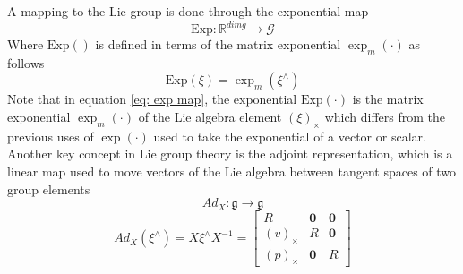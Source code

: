 A mapping to the Lie group is done through the exponential map \cite{Contact-Aided_Invarant_EKF}
\begin{equation}
    \text{Exp} : \mathbb{R}^{dim g} \rightarrow \mathcal{G}
    \label{eq: exp map}
\end{equation}
Where $\text{Exp}()$ is defined in terms of the matrix exponential $ \exp_m{(\cdot)}$ as follows
\begin{equation}
    \text{Exp}(\xi) = \exp_m{(\xi^{\wedge})}
    \label{eq: matrix exp def}
\end{equation}
Note that in equation \eqref{eq: exp map}, the exponential $\text{Exp}{(\cdot)}$ is the matrix exponential $\exp_m{(\cdot)}$ of the Lie algebra element $(\xi)_{\times}$ which differs from the previous uses of $\exp{(\cdot)}$ used to take the exponential of a vector or scalar. Another key concept in Lie group theory is the adjoint representation, which is a linear map used to move vectors of the Lie algebra between tangent spaces of two group elements \cite{Contact-Aided_Invarant_EKF}
\begin{equation}
    Ad_X : \mathfrak{g} \rightarrow \mathfrak{g}
    \label{eq: adj g->g}
\end{equation}
\begin{equation}
    Ad_X(\xi^{\wedge}) = X \xi^{\wedge} X^{-1} = 
    \begin{bmatrix}
        R & \mathbf{0} &\mathbf{0} \\
        (v)_{\times} & R & \mathbf{0}\\
        (p)_{\times} & \mathbf{0} & R
    \end{bmatrix}
    \label{eq: Ad x xi x^T}
\end{equation}

